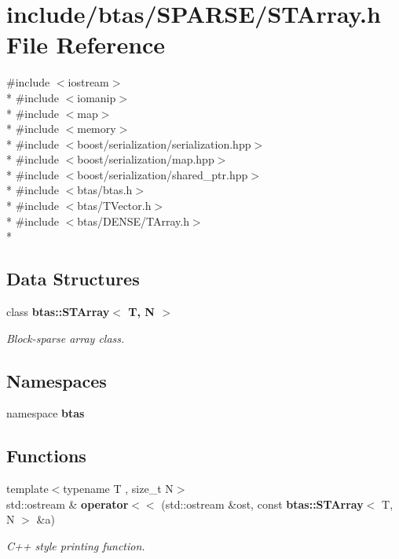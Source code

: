 \section{include/btas/\-S\-P\-A\-R\-S\-E/\-S\-T\-Array.h File Reference}
\label{d8/d9f/STArray_8h}
{\ttfamily \#include $<$iostream$>$}\\*
{\ttfamily \#include $<$iomanip$>$}\\*
{\ttfamily \#include $<$map$>$}\\*
{\ttfamily \#include $<$memory$>$}\\*
{\ttfamily \#include $<$boost/serialization/serialization.\-hpp$>$}\\*
{\ttfamily \#include $<$boost/serialization/map.\-hpp$>$}\\*
{\ttfamily \#include $<$boost/serialization/shared\-\_\-ptr.\-hpp$>$}\\*
{\ttfamily \#include $<$btas/btas.\-h$>$}\\*
{\ttfamily \#include $<$btas/\-T\-Vector.\-h$>$}\\*
{\ttfamily \#include $<$btas/\-D\-E\-N\-S\-E/\-T\-Array.\-h$>$}\\*
\subsection*{Data Structures}
\begin{DoxyCompactItemize}
\item 
class {\bf btas\-::\-S\-T\-Array$<$ T, N $>$}
\begin{DoxyCompactList}\small\item\em Block-\/sparse array class. \end{DoxyCompactList}\end{DoxyCompactItemize}
\subsection*{Namespaces}
\begin{DoxyCompactItemize}
\item 
namespace {\bf btas}
\end{DoxyCompactItemize}
\subsection*{Functions}
\begin{DoxyCompactItemize}
\item 
{\footnotesize template$<$typename T , size\-\_\-t N$>$ }\\std\-::ostream \& {\bf operator$<$$<$} (std\-::ostream \&ost, const {\bf btas\-::\-S\-T\-Array}$<$ T, N $>$ \&a)
\begin{DoxyCompactList}\small\item\em C++ style printing function. \end{DoxyCompactList}\end{DoxyCompactItemize}


